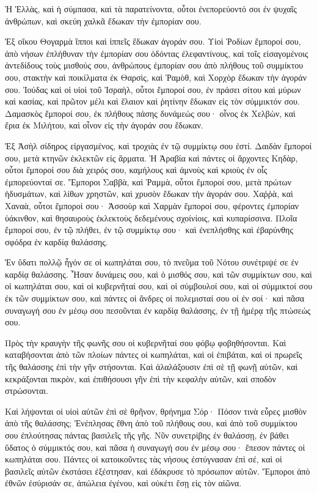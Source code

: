 {Ἡ Ἑλλὰς, καὶ ἡ σύμπασα, καὶ τὰ παρατείνοντα, οὗτοι ἐνεπορεύοντό σοι ἐν ψυχαῖς ἀνθρώπων, καὶ σκεύη χαλκᾶ ἔδωκαν τὴν ἐμπορίαν σου.
\par }{\PP {}Ἐξ οἴκου Θογαρμὰ ἵπποι καὶ ἱππεῖς ἔδωκαν ἀγοράν σου.
Υἱοὶ Ῥοδίων ἔμποροί σου, ἀπὸ νήσων ἐπλήθυναν τὴν ἐμπορίαν σου ὀδόντας ἐλεφαντίνους, καὶ τοῖς εἰσαγομένοις ἀντεδίδους τοὺς μισθούς σου,
ἀνθρώπους ἐμπορίαν σου ἀπὸ πλήθους τοῦ συμμίκτου σου, στακτὴν καὶ ποικίλματα ἐκ Θαρσὶς, καὶ Ῥαμὸθ, καὶ Χορχὸρ ἔδωκαν τὴν ἀγοράν σου.
Ἰούδας καὶ οἱ υἱοὶ τοῦ Ἰσραὴλ, οὗτοι ἔμποροί σου, ἐν πράσει σίτου καὶ μύρων καὶ κασίας, καὶ πρῶτον μέλι καὶ ἔλαιον καὶ ῥητίνην ἔδωκαν εἰς τὸν σύμμικτόν σου.
Δαμασκὸς ἔμποροί σου, ἐκ πλήθους πάσης δυνάμεώς σου· οἶνος ἐκ Χελβὼν, καὶ ἔρια ἐκ Μιλήτου, καὶ οἶνον εἰς τὴν ἀγοράν σου ἔδωκαν.
\par }{\PP {}Ἐξ Ἀσὴλ σίδηρος εἰργασμένος, καὶ τροχιὰς ἐν τῷ συμμίκτῳ σου ἐστί.
Δαιδὰν ἔμποροί σου, μετὰ κτηνῶν ἐκλεκτῶν εἰς ἅρματα.
Ἡ Ἀραβία καὶ πάντες οἱ ἄρχοντες Κηδὰρ, οὗτοι ἔμποροί σου διὰ χειρός σου, καμήλους καὶ ἀμνοὺς καὶ κριοὺς ἐν οἷς ἐμπορεύονταί σε.
Ἔμποροι Σαββὰ, καὶ Ῥαμμὰ, οὗτοι ἔμποροί σου, μετὰ πρώτων ἡδυσμάτων, καὶ λίθων χρηστῶν, καὶ χρυσὸν ἔδωκαν τὴν ἀγοράν σου.
Χαῤῥὰ, καὶ Χαναὰ, οὗτοι ἔμποροί σου·
Ἀσσοὺρ καὶ Χαρμὰν ἔμποροί σου, φέροντες ἐμπορίαν ὑάκινθον, καὶ θησαυροὺς ἐκλεκτοὺς δεδεμένους σχοίνίοις, καὶ κυπαρίσσινα.
Πλοῖα ἔμποροί σου, ἐν τῷ πλήθει, ἐν τῷ συμμίκτῳ σου· καὶ ἐνεπλήσθης καὶ ἐβαρύνθης σφόδρα ἐν καρδίᾳ θαλάσσης.
\par }{\PP {}Ἐν ὕδατι πολλῷ ἦγόν σε οἱ κωπηλάται σου, τὸ πνεῦμα τοῦ Νότου συνέτριψέ σε ἐν καρδίᾳ θαλάσσης.
Ἦσαν δυνάμεις σου, καὶ ὁ μισθός σου, καὶ τῶν συμμίκτων σου, καὶ οἱ κωπηλάται σου, καὶ οἱ κυβερνῆταί σου, καὶ οἱ σύμβουλοί σου, καὶ οἱ σύμμικτοί σου ἐκ τῶν συμμίκτων σου, καὶ πάντες οἱ ἄνδρες οἱ πολεμισταί σου οἱ ἐν σοί· καὶ πᾶσα συναγωγή σου ἐν μέσῳ σου πεσοῦνται ἐν καρδίᾳ θαλάσσης, ἐν τῇ ἡμέρᾳ τῆς πτώσεώς σου.
\par }{\PP {}Πρὸς τὴν κραυγὴν τῆς φωνῆς σου οἱ κυβερνῆταί σου φόβῳ φοβηθήσονται.
Καὶ καταβήσονται ἀπὸ τῶν πλοίων πάντες οἱ κωπηλάται, καὶ οἱ ἐπιβάται, καὶ οἱ πρωρεῖς τῆς θαλάσσης ἐπὶ τὴν γῆν στήσονται.
Καὶ ἀλαλάξουσιν ἐπὶ σὲ τῇ φωνῇ αὐτῶν, καὶ κεκράξονται πικρὸν, καὶ ἐπιθήσουσι γῆν ἐπὶ τὴν κεφαλὴν αὐτῶν, καὶ σποδὸν στρώσονται.
\par }{\PP {}Καὶ λήψονται οἱ υἱοὶ αὐτῶν ἐπὶ σὲ θρῆνον, θρήνημα Σόρ·
Πόσον τινὰ εὗρες μισθὸν ἀπὸ τῆς θαλάσσης; Ἐνέπλησας ἔθνη ἀπὸ τοῦ πλήθους σου, καὶ ἀπὸ τοῦ συμμίκτου σου ἐπλούτησας πάντας βασιλεῖς τῆς γῆς.
Νῦν συνετρίβης ἐν θαλάσσῃ, ἐν βάθει ὕδατος ὁ σύμμικτός σου, καὶ πᾶσα ἡ συναγωγή σου ἐν μέσῳ σου· ἔπεσον πάντες οἱ κωπηλάται σου.
Πάντες οἱ κατοικοῦντες τὰς νήσους ἐστύγνασαν ἐπὶ σέ, καὶ οἱ βασιλεῖς αὐτῶν ἐκστάσει ἐξέστησαν, καὶ ἐδάκρυσε τὸ πρόσωπον αὐτῶν.
Ἔμποροι ἀπὸ ἐθνῶν ἐσύρισάν σε, ἀπώλεια ἐγένου, καὶ οὐκέτι ἔσῃ εἰς τὸν αἰῶνα.

}
